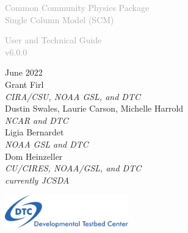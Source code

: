 \begin{titlepage}
\renewcommand{\thefootnote}{\fnsymbol{footnote}}

\vspace*{1em}
\noindent

\begin{center}
\textcolor{darkgray}{\bigsf Common Community Physics Package\\[0.5ex] Single Column Model (SCM)}
\vspace*{1em}\par

\textcolor{darkgray}{\bigst User and Technical Guide\\[0.5ex] v6.0.0}
\vspace*{1em}\par

\large{June 2022}\\

Grant Firl\\
\textit{\small{CIRA/CSU, NOAA GSL, and DTC}}\\[4em]

Dustin Swales, Laurie Carson, Michelle Harrold\\
\textit{\small{NCAR and DTC}}\\[4em]

Ligia Bernardet\\
\textit{\small{NOAA GSL and DTC}}\\[4em]

Dom Heinzeller\\
\textit{\small{CU/CIRES, NOAA/GSL, and DTC}}\\
\textit{\small{currently JCSDA}}\\[4em]

\vspace{3em}

\includegraphics[width=0.4\textwidth]{images/dtc_logo.png}\\[2em]

\end{center}
\end{titlepage}
\pagebreak{}
